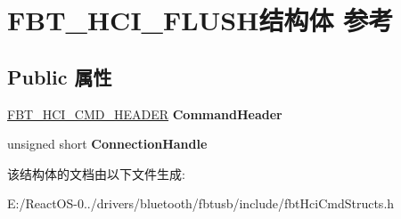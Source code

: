\hypertarget{struct_f_b_t___h_c_i___f_l_u_s_h}{}\section{F\+B\+T\+\_\+\+H\+C\+I\+\_\+\+F\+L\+U\+S\+H结构体 参考}
\label{struct_f_b_t___h_c_i___f_l_u_s_h}
\subsection*{Public 属性}
\begin{DoxyCompactItemize}
\item 
\mbox{\label{struct_f_b_t___h_c_i___f_l_u_s_h_a7f78afa253e1ba7231916752f787441d}} 
\hyperlink{struct_f_b_t___h_c_i___c_m_d___h_e_a_d_e_r}{F\+B\+T\+\_\+\+H\+C\+I\+\_\+\+C\+M\+D\+\_\+\+H\+E\+A\+D\+ER} {\bfseries Command\+Header}
\item 
\mbox{\label{struct_f_b_t___h_c_i___f_l_u_s_h_a529b9d370d1d77c7e470c2d43b554143}} 
unsigned short {\bfseries Connection\+Handle}
\end{DoxyCompactItemize}


该结构体的文档由以下文件生成\+:\begin{DoxyCompactItemize}
\item 
E\+:/\+React\+O\+S-\/0../drivers/bluetooth/fbtusb/include/fbt\+Hci\+Cmd\+Structs.\+h\end{DoxyCompactItemize}
